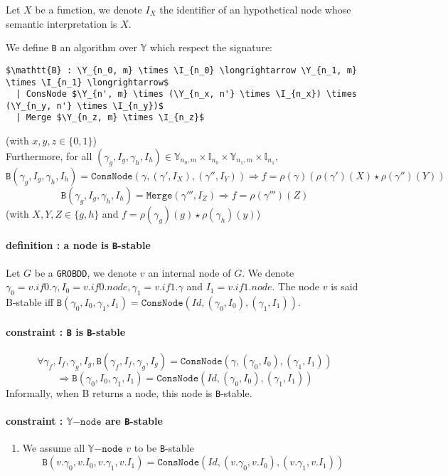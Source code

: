 \documentclass[a4paper,10pt]{article}
\newcommand{\Y}{\mathbb{Y}}
\newcommand{\I}{\mathbb{I}}
\newcommand{\Ynode}{\Y\mathtt{-node}}
\newcommand{\GroBdd}{\texttt{GROBDD}}
\begin{document}
Let $X$ be a function, we denote $I_X$ the identifier of an hypothetical node whose semantic interpretation is $X$.

We define \texttt{B} an algorithm over $\Y$ which respect the signature:
\begin{lstlisting}
$\mathtt{B} : \Y_{n_0, m} \times \I_{n_0} \longrightarrow \Y_{n_1, m} \times \I_{n_1} \longrightarrow$
  | ConsNode $\Y_{n', m} \times (\Y_{n_x, n'} \times \I_{n_x}) \times (\Y_{n_y, n'} \times \I_{n_y})$
  | Merge $\Y_{n_z, m} \times \I_{n_z}$
\end{lstlisting}
(with $x, y, z \in \{0, 1\}$) \\
Furthermore, for all $(\gamma_g, I_g, \gamma_h, I_h) \in \Y_{n_0, m} \times \I_{n_0} \times \Y_{n_1, m} \times \I_{n_1}$, 
\[ \texttt{B}(\gamma_g, I_g, \gamma_h, I_h) = \texttt{ConsNode} (\gamma, (\gamma', I_X), (\gamma'', I_Y)) \Rightarrow f = \rho\left(\gamma\right) \left(\rho\left(\gamma'\right)(X) \star \rho\left(\gamma''\right)(Y)\right)\]
\[ \texttt{B}(\gamma_g, I_g, \gamma_h, I_h) = \texttt{Merge} (\gamma''', I_Z) \Rightarrow f = \rho(\gamma''')(Z) \]
(with $X, Y, Z \in\{g, h\}$ and $f = \rho(\gamma_g)(g) \star \rho(\gamma_h)(y)$)

\paragraph{definition : a node is \texttt{B}-stable\\}
Let $G$ be a \GroBdd{}, we denote $v$ an internal node of $G$.
We denote $\gamma_0 = v.if0.\gamma, I_0 = v.if0.node, \gamma_1 = v.if1.\gamma$ and $I_1 = v.if1.node$.
The node $v$ is said B-stable iff $\mathtt{B}(\gamma_0, I_0, \gamma_1, I_1) = \mathtt{ConsNode}(Id, (\gamma_0, I_0), (\gamma_1, I_1))$.

\paragraph{constraint : \texttt{B} is \texttt{B}-stable\\}
\[\forall \gamma_f, I_f, \gamma_g, I_g, \mathtt{B}(\gamma_f, I_f, \gamma_g, I_g) = \mathtt{ConsNode}(\gamma, (\gamma_0, I_0), (\gamma_1, I_1))\]
\[\Rightarrow \mathtt{B}(\gamma_0, I_0, \gamma_1, I_1) = \mathtt{ConsNode}(Id, (\gamma_0, I_0), (\gamma_1, I_1))\]
Informally, when B returns a node, this node is \texttt{B}-stable.

\paragraph{constraint : $\Ynode$ are \texttt{B}-stable}
\begin{enumerate}
\item We assume all $\Ynode$ $v$ to be \texttt{B}-stable
\[\mathtt{B}(v.\gamma_0, v.I_0, v.\gamma_1, v.I_1) = \mathtt{ConsNode}(Id, (v.\gamma_0, v.I_0), (v.\gamma_1, v.I_1))\]
\end{enumerate}
\end{document}
